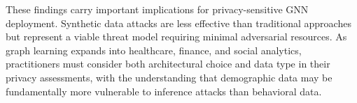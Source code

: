 \documentclass{article}
\begin{document}
These findings carry important implications for privacy-sensitive GNN deployment. Synthetic data attacks are less effective than traditional approaches but represent a viable threat model requiring minimal adversarial resources. As graph learning expands into healthcare, finance, and social analytics, practitioners must consider both architectural choice and data type in their privacy assessments, with the understanding that demographic data may be fundamentally more vulnerable to inference attacks than behavioral data.




\end{document}
